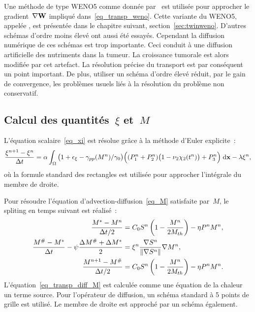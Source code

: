 \documentclass[main.tex]{subfiles}
\begin{document}
Une méthode de type WENO5 comme donnée par~\cite{Liu1994} est utilisée pour approcher le gradient~$\nabla {\bf W}$ impliqué  dans~\eqref{eq_transp_weno}. Cette variante du WENO5, appelée \twinweno, est présentée dans le chapitre suivant, section~\ref{sec:twinweno}. 
D'autres schémas d'ordre moins élevé ont aussi été essayés. Cependant la diffusion numérique de ces schémas est trop importante. Ceci conduit à une diffusion artificielle des nutriments dans la tumeur. La croissance tumorale est alors modifiée par cet artefact. La résolution précise du transport est par conséquent un point important. De plus,  utiliser un schéma d'ordre élevé réduit, par le gain de convergence, les problèmes usuels liés à la résolution du problème non conservatif.

\subsection{Calcul des quantités~$\xi$ et~$M$}
L'équation scalaire~\eqref{eq_xi} est résolue grâce à la méthode d'Euler explicite~:
\begin{equation}\label{eq:xi_disc}
\dfrac{\xi^{n+1}-\xi^n}{\Delta t} = \alpha \int_\Omega \big(1+\epsilon_{\xi} - \gamma_{pp}(M^n) / \gamma_0 \big)\Big((P_1^n +P_2^n) \big(1-\nu_2 \chi_2(t^n) \big)+P_3^n \Big) \textrm{\;d}\mathbf{x} - \lambda \xi^n,
\end{equation} 
où la formule standard des rectangles est utilisée pour approcher l'intégrale du membre de droite.


Pour résoudre l'équation d'advection-diffusion~\eqref{eq_M}
satisfaite par~$M$, le spliting en temps suivant est réalisé~:
\begin{align}
\dfrac{M^*-M^n}{\Delta t/2} &= C_0 S^n \left( 1-\dfrac{M^n}{2\Ms}\right) - \eta P^nM^n, %
\\
\dfrac{M^{\#}-M^*}{\Delta t} - \psi \dfrac{ \Delta M^\# + \Delta M^*}{2} &= \xi^n  \dfrac{\nabla S^n}{\| \nabla S^n \| }\nabla M^n, %
\label{eq_transp_diff_M}\\
\dfrac{M^{n+1}-M^\#}{\Delta t/2} &= C_0 S^n \left( 1-\dfrac{M^n}{2\Ms}\right) - \eta P^nM^n. \label{eq_snd_membre_M}
\end{align}
L'équation~\eqref{eq_transp_diff_M} est calculée comme une équation de la chaleur un terme source.  Pour l'opérateur de diffusion, un schéma standard à 5 points de grille est utilisé. Le membre de droite est approché par un schéma \twinweno également.


\end{document}
